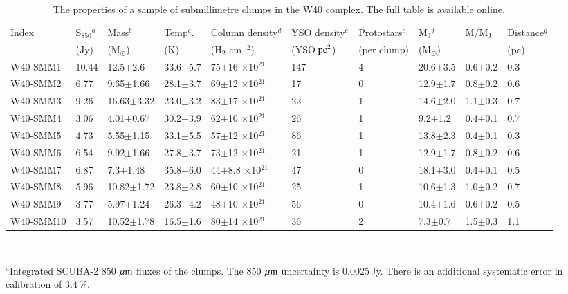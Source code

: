 \begin{table*}%
\caption{The properties of a sample of submillimetre clumps in the W40 complex. The full table is available online.}
\begin{tabular}{@{}llllllllll}
Index	&	S$_{850}$$^{a}$	&	Mass$^{b}$	&	Temp$^{c}$.	&	Column density$^{d}$	&	YSO density$^{e}$	&	Protostars$^{e}$	&	M$_{\mathrm{J}}$$^{f}$	&	M/M$_{\mathrm{J}}$	&	Distance$^{g}$ \\
	&	(Jy)	&	(M$_{\odot}$)	&	(K)	&	(H$_{2}$ cm$^{-2}$)	&	(YSO$\hbox{ pc$^{2}$}$)	&	(per clump)	&	(M$_{\odot}$)	&		&	(pc) \\
\hline
\hline
W40-SMM1	&	10.44	&	12.5$\pm$2.6	&	33.6$\pm$5.7	&	75$\pm$16 $\times$10$^{21}$	&	147	&	4	&	20.6$\pm$3.5	&	0.6$\pm$0.2	&	0.3\\
W40-SMM2	&	6.77	&	9.65$\pm$1.66	&	28.1$\pm$3.7	&	69$\pm$12 $\times$10$^{21}$	&	17	&	0	&	12.9$\pm$1.7	&	0.8$\pm$0.2	&	0.6\\
W40-SMM3	&	9.26	&	16.63$\pm$3.32	&	23.0$\pm$3.2	&	83$\pm$17 $\times$10$^{21}$	&	22	&	1	&	14.6$\pm$2.0	&	1.1$\pm$0.3	&	0.7\\
W40-SMM4	&	3.06	&	4.01$\pm$0.67	&	30.2$\pm$3.9	&	62$\pm$10 $\times$10$^{21}$	&	26	&	1	&	9.2$\pm$1.2	&	0.4$\pm$0.1	&	0.7\\
W40-SMM5	&	4.73	&	5.55$\pm$1.15	&	33.1$\pm$5.5	&	57$\pm$12 $\times$10$^{21}$	&	86	&	1	&	13.8$\pm$2.3	&	0.4$\pm$0.1	&	0.3\\
W40-SMM6	&	6.54	&	9.92$\pm$1.66	&	27.8$\pm$3.7	&	73$\pm$12 $\times$10$^{21}$	&	21	&	1	&	12.9$\pm$1.7	&	0.8$\pm$0.2	&	0.6\\
W40-SMM7	&	6.87	&	7.3$\pm$1.48	&	35.8$\pm$6.0	&	44$\pm$8.8 $\times$10$^{21}$	&	47	&	0	&	18.1$\pm$3.0	&	0.4$\pm$0.1	&	0.5\\
W40-SMM8	&	5.96	&	10.82$\pm$1.72	&	23.8$\pm$2.8	&	60$\pm$10 $\times$10$^{21}$	&	25	&	1	&	10.6$\pm$1.3	&	1.0$\pm$0.2	&	0.7\\
W40-SMM9	&	3.77	&	5.97$\pm$1.24	&	26.3$\pm$4.2	&	48$\pm$10 $\times$10$^{21}$	&	56		&	0	&	10.4$\pm$1.6	&	0.6$\pm$0.2	&	0.5\\
W40-SMM10	&	3.57	&	10.52$\pm$1.78	&	16.5$\pm$1.6	&	80$\pm$14 $\times$10$^{21}$	&	36	&	2	&	7.3$\pm$0.7	&	1.5$\pm$0.3	&	1.1\\
\hline
\end{tabular}\\
\raggedright
$^{a}$Integrated SCUBA-2 850\,$\,\mu\rm{m}$ fluxes of the clumps. The 850\,$\,\mu\rm{m}$ uncertainty is 0.0025\,Jy. There is an additional systematic error in calibration of  3.4\,\%.\\

\end{table*}
